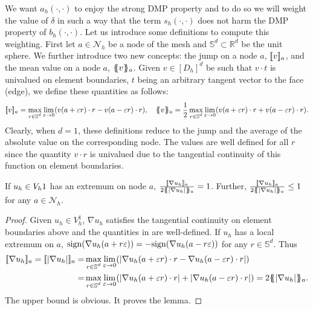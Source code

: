 We want $a_h(\cdot,\cdot)$ to enjoy the strong DMP property and to do so we will  weight the value of $\delta$ in such a way that the term $s_h(\cdot,\cdot)$ does not harm the DMP property of $b_h(\cdot,\cdot)$. Let us introduce some definitions to compute this weighting. First let $a\in \mathcal{N}_h$ be a node of the mesh and $\mathbb{S}^d\subset \mathbb{R}^d$ be the unit sphere. We further introduce two new concepts: the jump on a node $a$, $\lbrack\!\lbrack v \rbrack\!\rbrack_a$, and the mean value on a node $a$, $\{\! \!\{ v\}\! \!\}_a$. Given $v\in [D_h]^d$ be such that $v \cdot t$ is univalued on element boundaries, $t$ being an arbitrary tangent vector to the face (edge), we define these quantities as follows:
\begin{align}\label{eq-njump}
\lbrack\!\lbrack v \rbrack\!\rbrack_a = \max_{\substack{ r\in\mathbb{S}^d }} \lim_{\varepsilon \rightarrow 0} (v(a+\varepsilon r)\cdot r - v(a-\varepsilon r)\cdot r),  
\quad \{\! \!\{ v\}\! \!\}_a = \frac{1}{2} \max_{\substack{ r\in\mathbb{S}^d }} \lim_{\varepsilon \rightarrow 0} (v(a+\varepsilon r)\cdot r + v(a-\varepsilon r)\cdot r).
\end{align}
Clearly, when $d=1$, these definitions reduce to the jump and the average of the absolute value on the corresponding node. The values are well defined for all $r$ %
since the quantity $v \cdot r$ is univalued due to the tangential continuity of this function on element boundaries.  

\begin{lemma}\label{lem-extrema}
 If $u_h\in V_h1$ has an extremum on node $a$, $ \frac{\lbrack\!\lbrack \nabla u_h \rbrack\!\rbrack_a} { 2\{\! \!\{ |\nabla u_h|\}\! \!\}_a} = 1$. Further,  $ \frac{\lbrack\!\lbrack \nabla u_h \rbrack\!\rbrack_a} { 2\{\! \!\{ |\nabla u_h|\}\! \!\}_a} \leq 1$ for any $a \in \mathcal{N}_h$.
\end{lemma}
\begin{proof}
Given $u_h \in V_h^1$, $\nabla u_h$ satisfies the tangential continuity on element boundaries above and the quantities in  are well-defined. If $u_h$ has a local extremum on $a$, ${\rm sign} (\nabla u_h(a+r\varepsilon)) = -{\rm sign} (\nabla u_h(a-r\varepsilon))$ for any $ r\in \mathbb{S}^d$. Thus
\begin{align*}
\jump{\nabla u_h}_a = \jump{|\nabla u_h|}_a = & \max_{\substack{ r\in\mathbb{S}^d }} \lim_{\varepsilon \rightarrow 0} (|\nabla u_h(a+\varepsilon r)\cdot r - \nabla u_h(a-\varepsilon r)\cdot r|) \\
= &\max_{\substack{ r\in\mathbb{S}^d }} \lim_{\varepsilon \rightarrow 0} (|\nabla u_h(a+\varepsilon r)\cdot r | + |\nabla u_h(a-\varepsilon r)\cdot r|) =
2 \mean{|\nabla u_h|}_a.
\end{align*}
The upper bound is obvious. It proves the lemma.
\end{proof}

